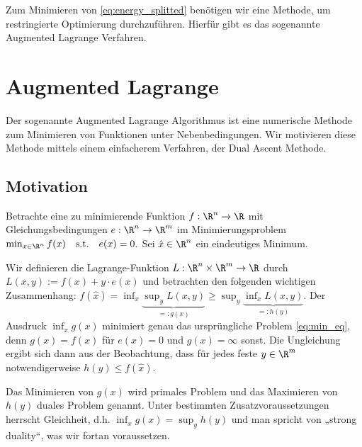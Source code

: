 \documentclass{mythesis}
\begin{document}
Zum Minimieren von \eqref{eq:energy_splitted} benötigen wir eine Methode, um restringierte Optimierung durchzuführen.
Hierfür gibt es das sogenannte Augmented Lagrange Verfahren.




\section{Augmented Lagrange} \label{section:augmented_lagrange}

Der sogenannte Augmented Lagrange Algorithmus ist eine numerische Methode zum Minimieren von Funktionen unter Nebenbedingungen.
Wir motivieren diese Methode mittels einem einfacherem Verfahren, der Dual Ascent Methode.

\subsection*{Motivation}

Betrachte eine zu minimierende Funktion $f: \R^n \to \R$ mit Gleichungsbedingungen $e: \R^n \to \R^m$ im Minimierungsproblem
\begin{math}[numbered] \label{eq:min_eq}
    \min_{x \in \R^n} f(x)
    \quad \mathrm{s.t.} \quad
    e(x) = 0.
\end{math}
Sei $\hat x \in \R^n$ ein eindeutiges Minimum.

Wir definieren die Lagrange-Funktion $L: \R^n \times \R^m \to \R$ durch
\begin{math}
    L(x,y) := f(x) + y \cdot e(x)
\end{math}
und betrachten den folgenden wichtigen Zusammenhang:
\begin{math}
    f(\hat x)
    =
    \inf_{x} \underbrace{\sup_{y} L(x,y)}_{=:g(x)}
    \ge
    \sup_{y} \underbrace{\inf_{x} L(x,y)}_{=:h(y)}.
\end{math}
Der Ausdruck $\inf_x g(x)$ minimiert genau das ursprüngliche Problem \eqref{eq:min_eq}, denn $g(x) = f(x)$ für $e(x) = 0$ und $g(x) = \infty$ sonst.
Die Ungleichung ergibt sich dann aus der Beobachtung, dass für jedes feste $y \in \R^m$ notwendigerweise $h(y) \le f(\hat x)$.

Das Minimieren von $g(x)$ wird primales Problem und das Maximieren von $h(y)$ duales Problem genannt.
Unter bestimmten Zusatzvoraussetzungen herrscht Gleichheit, d.h. $\inf_x g(x) = \sup_y h(y)$ und man spricht von „strong duality“, was wir fortan voraussetzen.
\end{document}
